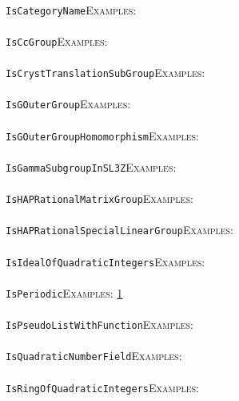 \documentclass[a4paper,11pt]{report}
\begin{document}
{{ \\
 \texttt{IsCategoryName}{\nobreakspace}{\nobreakspace}{\nobreakspace}{\nobreakspace}\textsc{Examples:} \\
 \\
 \texttt{IsCcGroup}{\nobreakspace}{\nobreakspace}{\nobreakspace}{\nobreakspace}\textsc{Examples:} \\
 \\
 \texttt{IsCrystTranslationSubGroup}{\nobreakspace}{\nobreakspace}{\nobreakspace}{\nobreakspace}\textsc{Examples:} \\
 \\
 \texttt{IsGOuterGroup}{\nobreakspace}{\nobreakspace}{\nobreakspace}{\nobreakspace}\textsc{Examples:} \\
 \\
 \texttt{IsGOuterGroupHomomorphism}{\nobreakspace}{\nobreakspace}{\nobreakspace}{\nobreakspace}\textsc{Examples:} \\
 \\
 \texttt{IsGammaSubgroupInSL3Z}{\nobreakspace}{\nobreakspace}{\nobreakspace}{\nobreakspace}\textsc{Examples:} \\
 \\
 \texttt{IsHAPRationalMatrixGroup}{\nobreakspace}{\nobreakspace}{\nobreakspace}{\nobreakspace}\textsc{Examples:} \\
 \\
 \texttt{IsHAPRationalSpecialLinearGroup}{\nobreakspace}{\nobreakspace}{\nobreakspace}{\nobreakspace}\textsc{Examples:} \\
 \\
 \texttt{IsIdealOfQuadraticIntegers}{\nobreakspace}{\nobreakspace}{\nobreakspace}{\nobreakspace}\textsc{Examples:} \\
 \\
 \texttt{IsPeriodic}{\nobreakspace}{\nobreakspace}{\nobreakspace}{\nobreakspace}\textsc{Examples:} \href{tutorial/chap10.html} {1}{\nobreakspace} \\
 \\
 \texttt{IsPseudoListWithFunction}{\nobreakspace}{\nobreakspace}{\nobreakspace}{\nobreakspace}\textsc{Examples:} \\
 \\
 \texttt{IsQuadraticNumberField}{\nobreakspace}{\nobreakspace}{\nobreakspace}{\nobreakspace}\textsc{Examples:} \\
 \\
 \texttt{IsRingOfQuadraticIntegers}{\nobreakspace}{\nobreakspace}{\nobreakspace}{\nobreakspace}\textsc{Examples:} \\
}}
\end{document}
